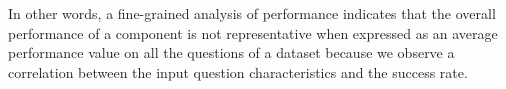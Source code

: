 \documentclass[sigconf,edbt]{acmart-edbt2019}
\begin{document}
In other words, a fine-grained analysis of performance indicates that the overall performance of a component is not representative when expressed as an average performance value on all the questions of a dataset because we observe a correlation between the input question characteristics and the success rate.
\end{document}
